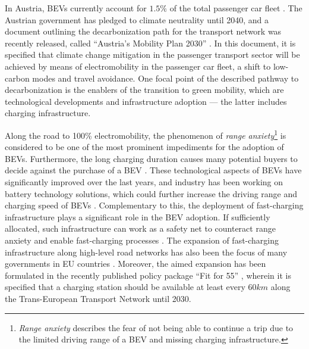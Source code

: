 \documentclass[journal,article,submit,pdftex,moreauthors]{Definitions/mdpi}
\begin{document}
In Austria, BEVs currently account for $1.5\%$ of the total passenger car fleet \cite{beoe}. The Austrian government has pledged to climate neutrality until 2040, and a document outlining the decarbonization path for the transport network was recently released, called \enquote{Austria's Mobility Plan 2030} \cite{Nachhaltig}. In this document, it is specified that climate change mitigation in the passenger transport sector will be achieved by means of electromobility in the passenger car fleet, a shift to low-carbon modes and travel avoidance. One focal point of the described pathway to decarbonization is the enablers of the transition to green mobility, which are technological developments and infrastructure adoption --- the latter includes charging infrastructure. 

Along the road to 100\% electromobility, the phenomenon of \textit{range anxiety}\footnote{\textit{Range anxiety} describes the fear of not being able to continue a trip due to the limited driving range of a BEV and missing charging infrastructure.} is considered to be one of the most prominent impediments for the adoption of BEVs. Furthermore, the long charging duration causes many potential buyers to decide against the purchase of a BEV \citep{Coffman2017, Efe2018}. These technological aspects of BEVs have significantly improved over the last years, and industry has been working on battery technology solutions, which could further increase the driving range and charging speed of BEVs \citep{IRENA2019, Thielmann2017}. Complementary to this, the deployment of fast-charging infrastructure plays a significant role in the BEV adoption. If sufficiently allocated, such infrastructure can work as a safety net to counteract range anxiety and enable fast-charging processes \citep{Neaimeh2017}. The expansion of fast-charging infrastructure along high-level road networks has also been the focus of many governments in EU countries \citep{Parliament2018}. Moreover, the aimed expansion has been formulated in the recently published policy package \enquote{Fit for 55} \citep{fit455}, wherein it is specified that a charging station should be available at least every $60km$ along the Trans-European Transport Network until 2030.
\end{document}
